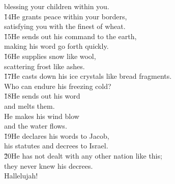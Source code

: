 \begin{poetry}
\poemll    blessing your children within you. \\
\poeml \v{14}He grants peace within your borders, \\
\poemll    satisfying you with the finest of wheat. \\
\poeml \v{15}He sends out his command to the earth, \\
\poemll    making his word go forth quickly. \\
\poeml \v{16}He supplies snow like wool, \\
\poemll    scattering frost like ashes. \\
\poeml \v{17}He casts down his ice crystals like bread fragments. \\
\poemll    Who can endure his freezing cold? \\
\poeml \v{18}He sends out his word \\
\poemll    and melts them. \\
\poeml He makes his wind blow \\
\poemll    and the water flows. \\
\poeml \v{19}He declares his words to Jacob, \\
\poemll    his statutes and decrees to Israel. \\
\poeml \v{20}He has not dealt with any other nation like this; \\
\poemll    they never knew his decrees. \\
\poeml Hallelujah!
\end{poetry}

